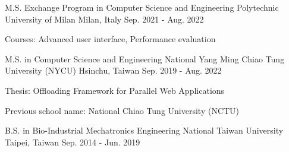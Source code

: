 

\begin{cventries}

  \cventry
    {M.S. Exchange Program in Computer Science and Engineering} %
    {Polytechnic University of Milan} %
    {Milan, Italy} %
    {Sep. 2021 - Aug. 2022} %
    {
      \begin{cvitems} %
        \item {Courses: Advanced user interface, Performance evaluation}
      \end{cvitems}
    }

  \cventry
    {M.S. in Computer Science and Engineering} %
    {National Yang Ming Chiao Tung University (NYCU)} %
    {Hsinchu, Taiwan} %
    {Sep. 2019 - Aug. 2022} %
    {
      \begin{cvitems} %
        \item {Thesis: Offloading Framework for Parallel Web Applications}
        \item {Previous school name: National Chiao Tung University (NCTU)}
      \end{cvitems}
    }

  \cventry
    {B.S. in Bio-Industrial Mechatronics Engineering} %
    {National Taiwan University} %
    {Taipei, Taiwan} %
    {Sep. 2014 - Jun. 2019} %
    {
      \begin{cvitems} %
      \end{cvitems}
    }

\end{cventries}
